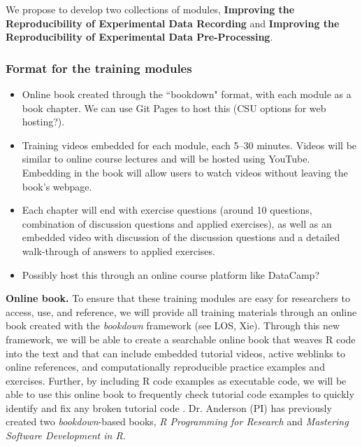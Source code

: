 \documentclass[pdftex,english,11pt,parskip=half]{scrartcl}
\begin{document}
We propose to develop two collections of modules, \textbf{Improving the Reproducibility of Experimental Data Recording} and \textbf{Improving the Reproducibility of Experimental Data Pre-Processing}. 





\subsubsection{Format for the training modules}

\begin{itemize}
\item Online book created through the ``bookdown" format, with each module as a book chapter. We can use Git Pages to host this (CSU options for web hosting?).
\item Training videos embedded for each module, each 5--30 minutes. Videos will be similar to online course lectures and will be hosted using YouTube. Embedding in the book will allow users to watch videos without leaving the book's webpage. 
\item Each chapter will end with exercise questions (around 10 questions, combination of discussion questions and applied exercises), as well as an embedded video with discussion of the discussion questions and a detailed walk-through of answers to applied exercises. 
\item Possibly host this through an online course platform like DataCamp?
\end{itemize}

\textbf{Online book.} To ensure that these training modules are easy for researchers to access, use, and reference, we will provide all training materials through an online book created with the \textit{bookdown} framework \cite{xie2016bookdown} (see LOS, Xie). Through this new framework, we will be able to create a searchable online book that weaves R code into the text and that can include embedded tutorial videos, active weblinks to online references, and computationally reproducible practice examples and exercises. Further, by including R code examples as executable code, we will be able to use this online book to frequently check tutorial code examples to quickly identify and fix any broken tutorial code \cite{xie2016bookdown}.  Dr. Anderson (PI) has previously created two \textit{bookdown}-based books, \textit{R Programming for Research} and \textit{Mastering Software Development in R}.  
\end{document}
